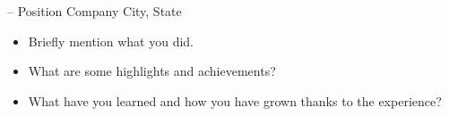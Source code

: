 \cventry
{ -- }
{Position}
{Company}
{City, State}
{}
{%
    \begin{itemize}
    \item
        Briefly mention what you did.
    \item
        What are some highlights and achievements?
    \item
        What have you learned and how you have grown thanks to the experience?
    \end{itemize}
}

